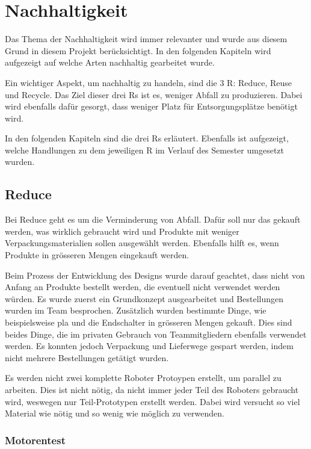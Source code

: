 \section{Nachhaltigkeit}
\label{section:Nachhaltigkeit}

Das Thema der Nachhaltigkeit wird immer relevanter und wurde aus diesem Grund in diesem Projekt berücksichtigt. In den folgenden Kapiteln wird aufgezeigt auf welche Arten nachhaltig gearbeitet wurde.

Ein wichtiger Aspekt, um nachhaltig zu handeln, sind die 3 R: Reduce, Reuse und Recycle. Das Ziel dieser drei Rs ist es, weniger Abfall zu produzieren. Dabei wird ebenfalls dafür gesorgt, dass weniger Platz für Entsorgungsplätze benötigt wird.\cite{3-r}

In den folgenden Kapiteln sind die drei Rs erläutert. Ebenfalls ist aufgezeigt, welche Handlungen zu dem jeweiligen R im Verlauf des Semester umgesetzt wurden.

\subsection{Reduce}

Bei Reduce geht es um die Verminderung von Abfall. Dafür soll nur das gekauft werden, was wirklich gebraucht wird und Produkte mit weniger Verpackungsmaterialien sollen ausgewählt werden. Ebenfalls hilft es, wenn Produkte in grösseren Mengen eingekauft werden.

Beim Prozess der Entwicklung des Designs wurde darauf geachtet, dass nicht von Anfang an Produkte bestellt werden, die eventuell nicht verwendet werden würden. Es wurde zuerst ein Grundkonzept ausgearbeitet und Bestellungen wurden im Team besprochen. Zusätzlich wurden bestimmte Dinge, wie beispielsweise \acrshort{pla} und die Endschalter in grösseren Mengen gekauft. Dies sind beides Dinge, die im privaten Gebrauch von Teammitgliedern ebenfalls verwendet werden. Es konnten jedoch Verpackung und Lieferwege gespart werden, indem nicht mehrere Bestellungen getätigt wurden. 

Es werden nicht zwei komplette Roboter Protoypen erstellt, um parallel zu arbeiten. Dies ist nicht nötig, da nicht immer jeder Teil des Roboters gebraucht wird, weswegen nur Teil-Prototypen erstellt werden. Dabei wird versucht so viel Material wie nötig und so wenig wie möglich zu verwenden.

\subsubsection{Motorentest}

